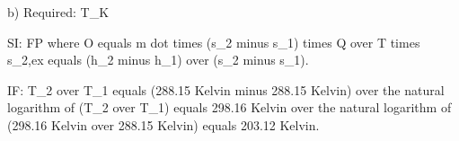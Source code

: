 b) Required: T_{K}

SI: FP where O equals m dot times (s_2 minus s_1) times Q over T times s_{2,ex} equals (h_2 minus h_1) over (s_2 minus s_1).

IF: T_2 over T_1 equals (288.15 Kelvin minus 288.15 Kelvin) over the natural logarithm of (T_2 over T_1) equals 298.16 Kelvin over the natural logarithm of (298.16 Kelvin over 288.15 Kelvin) equals 203.12 Kelvin.